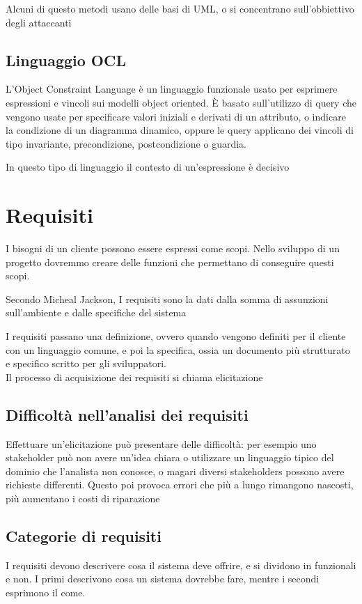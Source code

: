 \documentclass[12pt, a4paper]{article}
\begin{document}
Alcuni di questo metodi usano delle basi di UML, o si concentrano sull'obbiettivo degli attaccanti

\subsection{Linguaggio OCL}
L'Object Constraint Language è un linguaggio funzionale usato per esprimere espressioni e vincoli sui modelli object
oriented. È basato sull'utilizzo di query che vengono usate per specificare valori iniziali e derivati di un 
attributo, o indicare la condizione di un diagramma dinamico, oppure le query applicano dei vincoli di tipo
invariante, precondizione, postcondizione o guardia.

In questo tipo di linguaggio il contesto di un'espressione è decisivo

\newpage
\section{Requisiti}
I bisogni di un cliente possono essere espressi come scopi. Nello sviluppo di un progetto dovremmo creare delle 
funzioni che permettano di conseguire questi scopi.

Secondo Micheal Jackson, I requisiti sono la dati dalla somma di assunzioni sull'ambiente e dalle specifiche del 
sistema

I requisiti passano una definizione, ovvero quando vengono definiti per il cliente con un linguaggio comune, e
poi la specifica, ossia un documento più strutturato e specifico scritto per gli sviluppatori.\\ Il processo 
di acquisizione dei requisiti si chiama elicitazione

\subsection{Difficoltà nell'analisi dei requisiti}
Effettuare un'elicitazione può presentare delle difficoltà: per esempio uno stakeholder può non avere un'idea chiara
o utilizzare un linguaggio tipico del dominio che l'analista non conosce, o magari diversi stakeholders possono avere 
richieste differenti. Questo poi provoca errori che più a lungo rimangono nascosti, più aumentano i costi di 
riparazione

\subsection{Categorie di requisiti}
I requisiti devono descrivere cosa il sistema deve offrire, e si dividono in funzionali e non. I primi descrivono cosa
un sistema dovrebbe fare, mentre i secondi esprimono il come.
\end{document}
